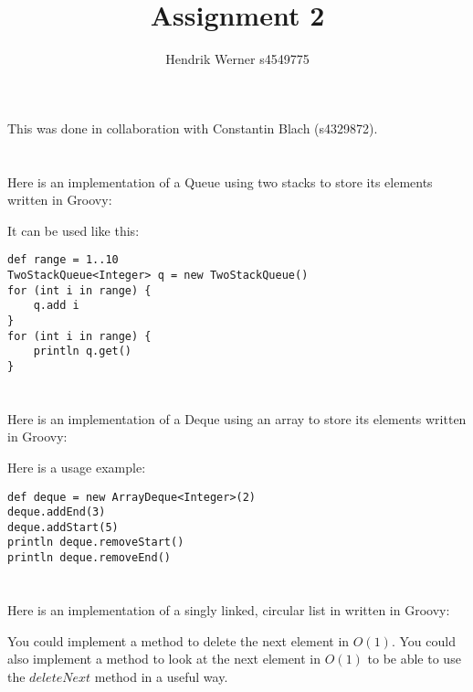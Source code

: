 \documentclass[12pt]{article}
\title {Assignment 2}
\author {Hendrik Werner s4549775}
\begin{document}
\maketitle

This was done in collaboration with Constantin Blach (s4329872).

\section{} %
Here is an implementation of a Queue using two stacks to store its elements written in Groovy:



It can be used like this:

\begin{lstlisting}
def range = 1..10
TwoStackQueue<Integer> q = new TwoStackQueue()
for (int i in range) {
    q.add i
}
for (int i in range) {
    println q.get()
}
\end{lstlisting}

\section{} %
Here is an implementation of a Deque using an array to store its elements written in Groovy:



Here is a usage example:

\begin{lstlisting}
def deque = new ArrayDeque<Integer>(2)
deque.addEnd(3)
deque.addStart(5)
println deque.removeStart()
println deque.removeEnd()
\end{lstlisting}

\section{} %
Here is an implementation of a singly linked, circular list in written in Groovy:



You could implement a method to delete the next element in $O(1)$. You could also implement a method to look at the next element in $O(1)$ to be able to use the $deleteNext$ method in a useful way.

\section{} %
\end{document}
